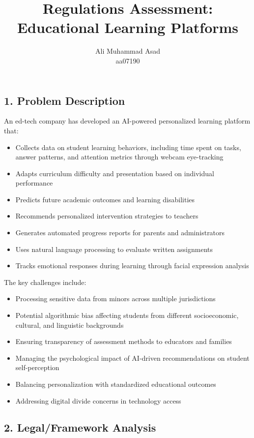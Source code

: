 \documentclass{article}
\title{Regulations Assessment: Educational Learning Platforms}
\author{Ali Muhammad Asad \\ aa07190}
\date{} %
\theoremstyle{mytheoremstyle}
\theoremstyle{mytheoremstyle}
\theoremstyle{myproblemstyle}
\begin{document}
    \maketitle

\subsection*{1. Problem Description}

An ed-tech company has developed an AI-powered personalized learning platform that:
\begin{itemize}
    \item Collects data on student learning behaviors, including time spent on tasks, answer patterns, and attention metrics through webcam eye-tracking
    \item Adapts curriculum difficulty and presentation based on individual performance
    \item Predicts future academic outcomes and learning disabilities
    \item Recommends personalized intervention strategies to teachers
    \item Generates automated progress reports for parents and administrators
    \item Uses natural language processing to evaluate written assignments
    \item Tracks emotional responses during learning through facial expression analysis
\end{itemize}

\noindent The key challenges include:
\begin{itemize}
    \item Processing sensitive data from minors across multiple jurisdictions
    \item Potential algorithmic bias affecting students from different socioeconomic, cultural, and linguistic backgrounds
    \item Ensuring transparency of assessment methods to educators and families
    \item Managing the psychological impact of AI-driven recommendations on student self-perception
    \item Balancing personalization with standardized educational outcomes
    \item Addressing digital divide concerns in technology access
\end{itemize}

\subsection*{2. Legal/Framework Analysis}
\end{document}
